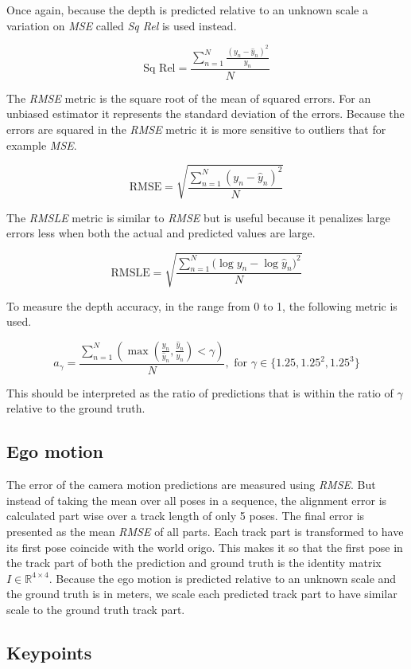 Once again, because the depth is predicted relative to an unknown scale a variation on \textit{MSE} called \textit{Sq Rel} is used instead.

\[
\textrm{Sq Rel}=\frac{\sum^N_{n=1}{\frac{(y_n-\hat{y}_n)^2}{y_n}}}{N}
\]

The \textit{RMSE} metric is the square root of the mean of squared errors. For an unbiased estimator it represents the standard deviation of the errors. Because the errors are squared in the \textit{RMSE} metric it is more sensitive to outliers that for example \textit{MSE}.

\[
\textrm{RMSE}=\sqrt{\frac{\sum^N_{n=1}{(y_n-\hat{y}_n)^2}}{N}}
\]

The \textit{RMSLE} metric is similar to \textit{RMSE} but is useful because it penalizes large errors less when both the actual and predicted values are large.

\[
\textrm{RMSLE}=\sqrt{\frac{\sum^N_{n=1}{(\log{y_n}-\log{\hat{y}_n)}^2}}{N}}
\]

To measure the depth accuracy, in the range from 0 to 1, the following metric is used.

\[
a_{\gamma} = \frac{\sum^N_{n=1}{(\max(\frac{y_n}{\hat{y}_n}, \frac{\hat{y}_n}{y_n}) < \gamma)}}{N},\textrm{ for }\gamma \in \{1.25, 1.25^2, 1.25^3\}
\]

This should be interpreted as the ratio of predictions that is within the ratio of $ \gamma $ relative to the ground truth.

\subsection{Ego motion}

The error of the camera motion predictions are measured using \textit{RMSE}. But instead of taking the mean over all poses in a sequence, the alignment error is calculated part wise over a track length of only 5 poses. The final error is presented as the mean \textit{RMSE} of all parts. Each track part is transformed to have its first pose coincide with the world origo. This makes it so that the first pose in the track part of both the prediction and ground truth is the identity matrix $I \in \mathbb{R}^{4\times 4}$. Because the ego motion is predicted relative to an unknown scale and the ground truth is in meters, we scale each predicted track part to have similar scale to the ground truth track part.

\subsection{Keypoints}

